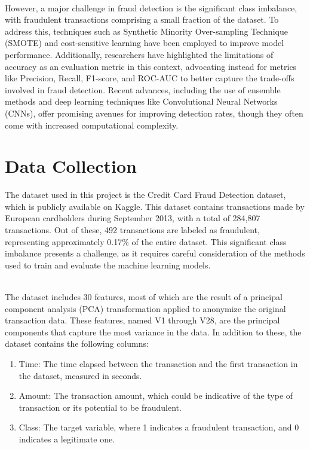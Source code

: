 \documentclass{article}
\begin{document}
\ \\
\noindent
However, a major challenge in fraud detection is the significant class imbalance, with fraudulent transactions comprising a small fraction of the dataset. To address this, techniques such as Synthetic Minority Over-sampling Technique (SMOTE) and cost-sensitive learning have been employed to improve model performance. Additionally, researchers have highlighted the limitations of accuracy as an evaluation metric in this context, advocating instead for metrics like Precision, Recall, F1-score, and ROC-AUC to better capture the trade-offs involved in fraud detection. Recent advances, including the use of ensemble methods and deep learning techniques like Convolutional Neural Networks (CNNs), offer promising avenues for improving detection rates, though they often come with increased computational complexity.

\section{Data Collection}

The dataset used in this project is the Credit Card Fraud Detection dataset, which is publicly available on Kaggle. This dataset contains transactions made by European cardholders during September 2013, with a total of 284,807 transactions. Out of these, 492 transactions are labeled as fraudulent, representing approximately 0.17\% of the entire dataset. This significant class imbalance presents a challenge, as it requires careful consideration of the methods used to train and evaluate the machine learning models.

\ \\
\noindent
The dataset includes 30 features, most of which are the result of a principal component analysis (PCA) transformation applied to anonymize the original transaction data. These features, named V1 through V28, are the principal components that capture the most variance in the data. In addition to these, the dataset contains the following columns:

\begin{enumerate}
    \item Time: The time elapsed between the transaction and the first transaction in the dataset, measured in seconds.

    \item Amount: The transaction amount, which could be indicative of the type of transaction or its potential to be fraudulent.

    \item Class: The target variable, where 1 indicates a fraudulent transaction, and 0 indicates a legitimate one.
\end{enumerate}
\end{document}
